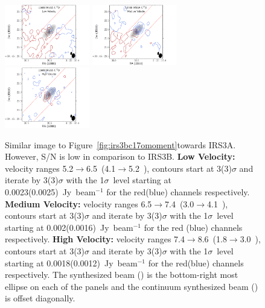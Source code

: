 


\begin{figure}[H]
\begin{center}
   \includegraphics[width=0.33\textwidth]{img/L1448IRS3B_C17O_image_taper1500k__-irs3asplitMoments_low_irs3a.pdf}
   \includegraphics[width=0.33\textwidth]{img/L1448IRS3B_C17O_image_taper1500k__-irs3asplitMoments_med_irs3a.pdf}
   \includegraphics[width=0.33\textwidth]{img/L1448IRS3B_C17O_image_taper1500k__-irs3asplitMoments_high_irs3a.pdf} 
\end{center}
   \caption{Similar image to Figure~\ref{fig:irs3bc17omoment}\space towards IRS3A. However, S/N is low in comparison to IRS3B. \textbf{Low Velocity:} velocity ranges 5.2$\rightarrow$6.5~\kms (4.1$\rightarrow$5.2~\kms), contours start at 3(3)$\sigma$ and iterate by 3(3)$\sigma$ with the 1$\sigma$~level starting at 0.0023(0.0025)~Jy~beam$^{-1}$ for the red(blue) channels respectively. \textbf{Medium Velocity:}  velocity ranges 6.5$\rightarrow$7.4~\kms (3.0$\rightarrow$4.1~\kms), contours start at 3(3)$\sigma$ and iterate by 3(3)$\sigma$ with the 1$\sigma$~level starting at 0.002(0.0016)~Jy~beam$^{-1}$ for the red (blue) channels respectively. \textbf{High Velocity:} velocity ranges 7.4$\rightarrow$8.6~\kms (1.8$\rightarrow$3.0~\kms), contours start at 3(3)$\sigma$ and iterate by 3(3)$\sigma$ with the 1$\sigma$~level starting at 0.0018(0.0012)~Jy~beam$^{-1}$ for the red(blue) channels respectively. The \cso\space synthesized beam (\csobeam) is the bottom-right most ellipse on each of the panels and the continuum synthesized beam (\contbeam) is offset diagonally.}\label{fig:irs3ac17omoment}
\end{figure}




